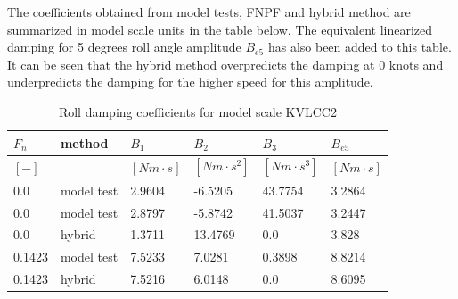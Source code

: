    The coefficients obtained from model tests, FNPF and hybrid method are
summarized in model scale units in the table below. The equivalent
linearized damping for 5 degrees roll angle amplitude $B_{e5}$ has
also been added to this table. It can be seen that the hybrid method
overpredicts the damping at 0 knots and underpredicts the damping for
the higher speed for this amplitude.
 
            
    
    
\begin{table}[H]
\scriptsize
\center
\caption{Roll damping coefficients for model scale KVLCC2}
\label{tab:results}
\begin{tabular}{llllll}
\toprule\addlinespace
$F_n$ & method & $B_1$ & $B_2$ & $B_3$ & $B_{e5}$\\ 
\midrule$[-]$ &  & $[Nm \cdot s]$ & $[Nm \cdot s^2]$ & $[Nm \cdot s^3]$ & $[Nm \cdot s]$\\ 
0.0 & model test & 2.9604 & -6.5205 & 43.7754 & 3.2864\\ 
0.0 & model test & 2.8797 & -5.8742 & 41.5037 & 3.2447\\ 
0.0 & hybrid & 1.3711 & 13.4769 & 0.0 & 3.828\\ 
0.1423 & model test & 7.5233 & 7.0281 & 0.3898 & 8.8214\\ 
0.1423 & hybrid & 7.5216 & 6.0148 & 0.0 & 8.6095\\ 

\bottomrule
\end{tabular}
\end{table}

    

    